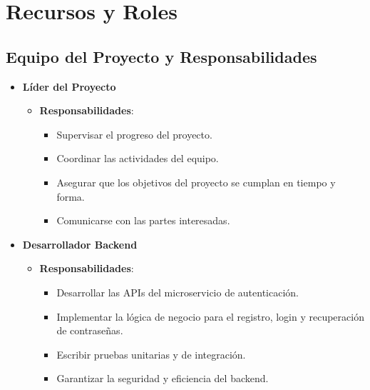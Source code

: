 \section{Recursos y Roles}

\subsection{Equipo del Proyecto y Responsabilidades}

\begin{itemize}
    \item \textbf{Líder del Proyecto}
          \begin{itemize}
              \item \textbf{Responsabilidades}:
                    \begin{itemize}
                        \item Supervisar el progreso del proyecto.
                        \item Coordinar las actividades del equipo.
                        \item Asegurar que los objetivos del proyecto se cumplan en tiempo y forma.
                        \item Comunicarse con las partes interesadas.
                    \end{itemize}
          \end{itemize}

    \item \textbf{Desarrollador Backend}
          \begin{itemize}
              \item \textbf{Responsabilidades}:
                    \begin{itemize}
                        \item Desarrollar las APIs del microservicio de autenticación.
                        \item Implementar la lógica de negocio para el registro, login y recuperación de contraseñas.
                        \item Escribir pruebas unitarias y de integración.
                        \item Garantizar la seguridad y eficiencia del backend.
                    \end{itemize}
          \end{itemize}


\end{itemize}
